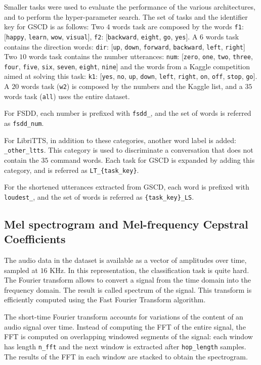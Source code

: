 Smaller tasks were used to evaluate the performance of the various
architectures, and to perform the hyper-parameter search.
The set of tasks and the identifier key for GSCD is as follows:
Two $4$ words task are composed by the words
\texttt{f1}: [\texttt{happy}, \texttt{learn}, \texttt{wow}, \texttt{visual}],
\texttt{f2}: [\texttt{backward}, \texttt{eight}, \texttt{go}, \texttt{yes}].
A $6$ words task contains the direction words:
\texttt{dir}: [\texttt{up}, \texttt{down}, \texttt{forward}, \texttt{backward},
\texttt{left}, \texttt{right}]
Two $10$ words task contains the number utterances:
\texttt{num}: [\texttt{zero}, \texttt{one}, \texttt{two}, \texttt{three}, \texttt{four},
\texttt{five}, \texttt{six}, \texttt{seven}, \texttt{eight}, \texttt{nine}]
and the words from a Kaggle competition aimed at solving this task:
\texttt{k1}: [\texttt{yes}, \texttt{no}, \texttt{up}, \texttt{down}, \texttt{left},
\texttt{right}, \texttt{on}, \texttt{off}, \texttt{stop}, \texttt{go}].
A $20$ words task (\texttt{w2}) is composed by the numbers and the Kaggle list, and
a $35$ words task (\texttt{all}) uses the entire dataset.

For FSDD, each number is prefixed with \texttt{fsdd\_}, and the set of words is
referred as \texttt{fsdd\_num}.

For LibriTTS, in addition to these categories, another word label is added:
\texttt{\_other\_ltts}. This category is used to discriminate a conversation
that does not contain the $35$ command words.
Each task for GSCD is expanded by adding this category, and is referred as
\texttt{LT\_\{task\_key\}}.

For the shortened utterances extracted from GSCD, each word is prefixed with
\texttt{loudest\_}, and
the set of words is referred as
\texttt{\{task\_key\}\_LS}.

\subsection{Mel spectrogram and Mel-frequency Cepstral Coefficients}

The audio data in the dataset is available as a vector of amplitudes over time,
sampled at $16$ KHz. In this representation, the classification task is quite
hard.
The Fourier transform allows to convert a signal from the time domain into the
frequency domain. The result is called spectrum of the signal. This transform
is efficiently computed using the Fast Fourier Transform algorithm.

The short-time Fourier transform accounts for variations of the content of an
audio signal over time. Instead of computing the FFT of the entire signal, the
FFT is computed on overlapping windowed segments of the signal: each window has
length \texttt{n\_fft} and the next window is extracted after
\texttt{hop\_length} samples.
The results of the FFT in each window are stacked to obtain the spectrogram.


